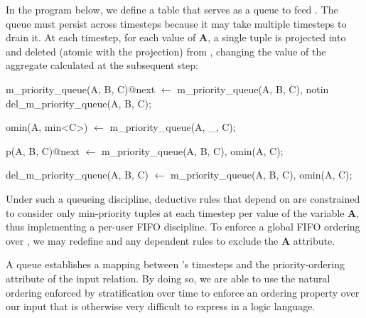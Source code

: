 In the program below, we define a table  that
serves as a queue to feed .  The queue must persist
across timesteps because it may take multiple timesteps to drain it.  At each
timestep, for each value of \textbf{A}, a single tuple is projected into
 and deleted (atomic with the projection) from
, changing the value of the aggregate calculated
at the subsequent step:

\begin{Dedalus}
m\_priority\_queue(A, B, C)@next \(\leftarrow\)
  m\_priority\_queue(A, B, C),
  notin del\_m\_priority\_queue(A, B, C);

omin(A, min<C>) \(\leftarrow\)
  m\_priority\_queue(A, _, C);

p(A, B, C)@next \(\leftarrow\)
  m\_priority\_queue(A, B, C),
  omin(A, C);

del\_m\_priority\_queue(A, B, C) \(\leftarrow\)
  m\_priority\_queue(A, B, C),
  omin(A, C);
\end{Dedalus}

Under such a queueing discipline, deductive rules that depend on
 are constrained to consider only min-priority tuples at each timestep
per value of the variable \textbf{A}, thus implementing a per-user FIFO
discipline.  To enforce a global FIFO ordering over , we
may redefine  and any dependent rules to exclude the \textbf{A}
attribute.

A queue establishes a mapping between \slang's timesteps
and the priority-ordering attribute of the input relation. By doing so, we are able to use the natural ordering enforced by stratification over time to enforce an ordering property over our input that is otherwise 
very difficult to express in a logic language.
